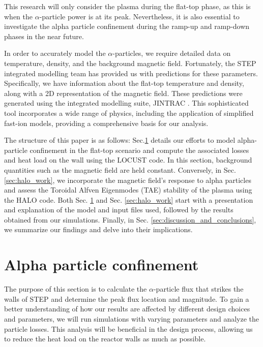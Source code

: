\documentclass[10pt, a4paper, twoside]{article}
\begin{document}
This research will only consider the plasma during the flat-top phase, as this is when the $\alpha$-particle power is at its peak. Nevertheless, it is also essential to investigate the alpha particle confinement during the ramp-up and ramp-down phases in the near future.

In order to accurately model the $\alpha$-particles, we require detailed data on temperature, density, and the background magnetic field. Fortunately, the STEP integrated modelling team has provided us with predictions for these parameters. Specifically, we have information about the flat-top temperature and density, along with a 2D representation of the magnetic field. These predictions were generated using the integrated modelling suite, JINTRAC \cite{meyer2023, mitchell2023}. This sophisticated tool incorporates a wide range of physics, including the application of simplified fast-ion models, providing a comprehensive basis for our analysis.

The structure of this paper is as follows: Sec.\ref{sec:locust_work} details our efforts to model alpha-particle confinement in the flat-top scenario and compute the associated losses and heat load on the wall using the LOCUST code. In this section, background quantities such as the magnetic field are held constant. Conversely, in Sec. \ref{sec:halo_work}, we incorporate the magnetic field's response to alpha particles and assess the Toroidal Alfven Eigenmodes (TAE) stability of the plasma using the HALO code. Both Sec. \ref{sec:locust_work} and Sec. \ref{sec:halo_work} start with a presentation and explanation of the model and input files used, followed by the results obtained from our simulations. Finally, in Sec. \ref{sec:discussion_and_conclusions}, we summarize our findings and delve into their implications.

\section{Alpha particle confinement}
\label{sec:locust_work}

The purpose of this section is to calculate the $\alpha$-particle flux that strikes the walls of STEP and determine the peak flux location and magnitude. To gain a better understanding of how our results are affected by different design choices and parameters, we will run simulations with varying parameters and analyze the particle losses. This analysis will be beneficial in the design process, allowing us to reduce the heat load on the reactor walls as much as possible.
\end{document}
